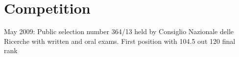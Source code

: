 \section{Competition}
May 2009: Public selection number 364/13 held by Consiglio Nazionale delle Ricerche with
written and oral exams. First
position with 104.5 out 120 final rank

